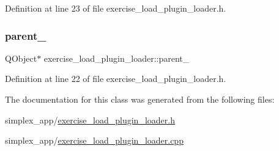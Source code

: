 Definition at line 23 of file exercise\+\_\+load\+\_\+plugin\+\_\+loader.\+h.

\mbox{\label{classexercise__load__plugin__loader_adba0ee3eb5d4ed08e25b302a0cd33afa}} 
\subsubsection{\texorpdfstring{parent\+\_\+}{parent\_}}
{\footnotesize\ttfamily Q\+Object$\ast$ exercise\+\_\+load\+\_\+plugin\+\_\+loader\+::parent\+\_\+\hspace{0.3cm}{\ttfamily [private]}}



Definition at line 22 of file exercise\+\_\+load\+\_\+plugin\+\_\+loader.\+h.



The documentation for this class was generated from the following files\+:\begin{DoxyCompactItemize}
\item 
simplex\+\_\+app/\hyperlink{exercise__load__plugin__loader_8h}{exercise\+\_\+load\+\_\+plugin\+\_\+loader.\+h}\item 
simplex\+\_\+app/\hyperlink{exercise__load__plugin__loader_8cpp}{exercise\+\_\+load\+\_\+plugin\+\_\+loader.\+cpp}\end{DoxyCompactItemize}
